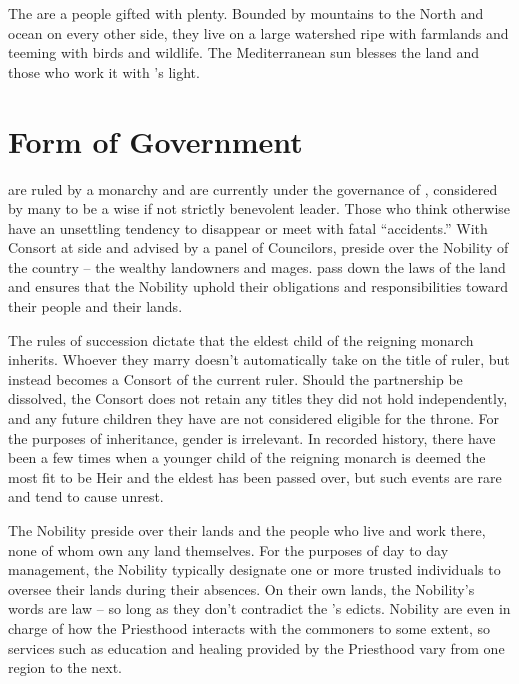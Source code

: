 \documentclass[blue]{GL2020}
\begin{document}
\name{\bAgrarians{}}

The \pFarmers{} are a people gifted with plenty.  Bounded by mountains to the North and ocean on every other side, they live on a large watershed ripe with farmlands and teeming with birds and wildlife.  The Mediterranean sun blesses the land and those who work it with \cFarmGod{}’s light.   

\section*{Form of Government}
\pFarm{} are ruled by a monarchy and are currently under the governance of \cQueen{\full}, considered by many to be a wise if not strictly benevolent leader.  Those who think otherwise have an unsettling tendency to disappear or meet with fatal ``accidents.''  With \cQueen{\their} Consort at \cQueen{\their} side and advised by a panel of Councilors, \cQueen{\they} preside\cQueen{\plural} over the Nobility of the country -- the wealthy landowners and mages.  \cQueen{\They} pass\cQueen{\pluralC} down the laws of the land and ensures that the Nobility uphold their obligations and responsibilities toward their people and their lands.

The rules of succession dictate that the eldest child of the reigning monarch inherits.  Whoever they marry doesn't automatically take on the title of ruler, but instead becomes a Consort of the current ruler.  Should the partnership be dissolved, the Consort does not retain any titles they did not hold independently, and any future children they have are not considered eligible for the throne.  For the purposes of inheritance, gender is irrelevant.  In recorded history, there have been a few times when a younger child of the reigning monarch is deemed the most fit to be Heir and the eldest has been passed over, but such events are rare and tend to cause unrest.

The Nobility preside over their lands and the people who live and work there, none of whom own any land themselves.  For the purposes of day to day management, the Nobility typically designate one or more trusted individuals to oversee their lands during their absences.  On their own lands, the Nobility's words are law – so long as they don't contradict the \cQueen{\Majesty}'s edicts.  Nobility are even in charge of how the Priesthood interacts with the commoners to some extent, so services such as education and healing provided by the Priesthood vary from one region to the next.
\end{document}
